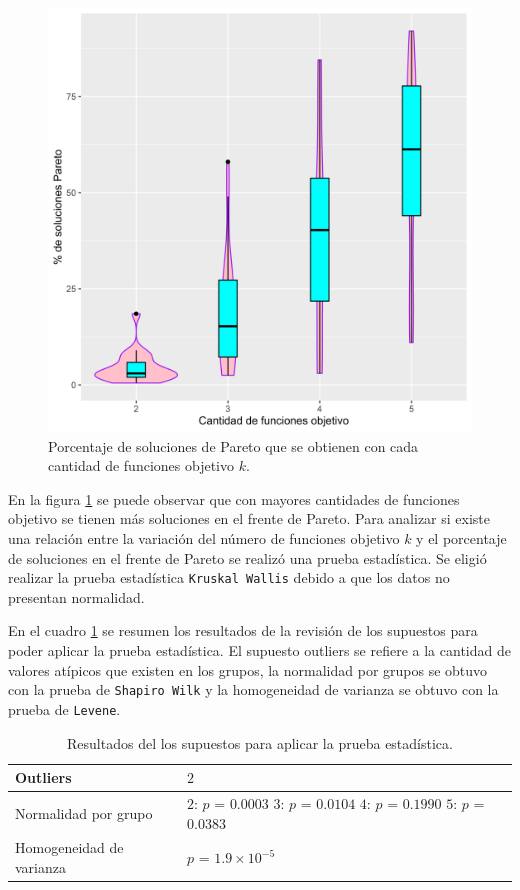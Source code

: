 \documentclass{article}
\begin{document}
\begin{figure} [h!]%
    \centering
    \includegraphics[width=150mm]{Figura1.png} %
    \caption{Porcentaje de soluciones de Pareto que se obtienen con cada cantidad de funciones objetivo $k$.}
    \label{f1}
\end{figure}

\newpage
En la figura \ref{f1} se puede observar que con mayores cantidades de funciones objetivo se tienen más soluciones en el frente de Pareto. Para analizar si existe una relación entre la variación del número de funciones objetivo $k$ y el porcentaje de soluciones en el frente de Pareto se realizó una prueba estadística. Se eligió realizar la prueba estadística \texttt{Kruskal Wallis} debido a que los datos no presentan normalidad.
\bigskip

En el cuadro \ref{Cuadro1} se  resumen los resultados de la revisión de los supuestos para poder aplicar la prueba estadística. El supuesto outliers se refiere a la cantidad de valores atípicos que existen en los grupos, la normalidad por grupos se obtuvo con la prueba de \texttt{Shapiro Wilk} y la homogeneidad de varianza se obtuvo con la prueba de \texttt{Levene}.

\begin{table}[ht]
\centering
\caption{Resultados del los supuestos para aplicar la prueba estadística.}
\smallskip

\begin{tabular}{ |p{2.1cm}|p{2.1cm}|}
 \hline
 Outliers & $2$ \\
 \hline
 Normalidad por grupo & $2$: $p$ = $0.0003$ $3$: $p$ = $0.0104$ $4$: $p$ = $0.1990$ $5$: $p$ = $0.0383$ \\
 \hline
 Homogeneidad de varianza & $p$ = $1.9\times 10^{-5}$ \\
 \hline
\end{tabular}
\label{Cuadro1}
\end{table}
\end{document}
